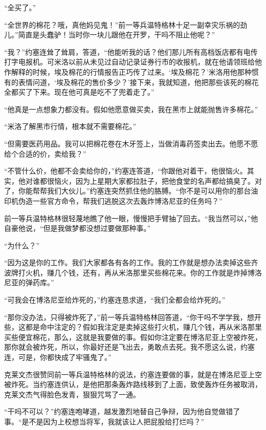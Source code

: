     “全买了。”

    “全世界的棉花？哦，真他妈见鬼！”前一等兵温特格林十足一副幸灾乐祸的劲儿。”简直是头蠢驴！当时你一块儿跟他在开罗，干吗不阻止他呢？”

    “我？”约塞连耸了耸肩，答道，“他能听我的话？他们那儿所有高档饭店都有电传打字电报机。可米洛以前从未见过自动记录证券行市的收报机，就在他请领班给他作解释的时候，埃及棉花的行情报告正巧传了过来。‘埃及棉花？’米洛用他那种惯有的表情问道，‘埃及棉花的售价多少？’接下来，我就知道，他把那些该死的棉花全都买了下来。现在他可真是吃不了兜着走了。”

    “他真是一点想象力都没有。假如他愿意做买卖，我在黑市上就能抛售许多棉花。”

    “米洛了解黑市行情，根本就不需要棉花。”

    “但需要医药用品。我可以把棉花卷在木牙签上，当做消毒药签卖出去。他愿不愿给个合适的价，卖给我？”

    “不管什么价，他都不会卖给你的，”约塞连答道，“你跟他对着干，他很恼火。其实，他对谁都很恼火，因为上星期大家都拉肚子，把他食堂的名声都给搞臭了。对了，你能帮帮我们大伙儿。”约塞连突然抓住他的胳膊。“你不是可以用你的那台油印机伪造一些官方命令，帮我们逃脱这次去轰炸博洛尼亚的任务吗？”

    前一等兵温特格林很轻蔑地瞧了他一眼，慢慢把手臂抽了回去。“我当然可以，”他自豪他说，“但是我做梦都没想过要做那种事。”

    “为什么？”

    “因为这是你的工作。我们大家都各有各的工作。我的工作就是想办法卖掉这些齐波牌打火机，赚几个钱，还有，再从米洛那里买些棉花来。你的工作就是炸掉博洛尼亚的弹药库。”

    “可我会在博洛尼亚给炸死的，”约塞连恳求道，“我们全都会给炸死的。”

    “那你没办法，只得被炸死了，”前一等兵温特格林回答道，“你干吗不学学我，想开些，这都是命中注定的？假如我注定是卖掉这些打火机，赚几个钱，再从米洛那里买些便宜棉花，那么，这就是我要做的事。假如你注定要在博洛尼亚上空被炸死，那你就会被炸死，所以，你最好还是飞出去，勇敢点去死。我不愿这么说，约塞连，可是，你都快成了牢骚鬼了。”

    克莱文杰很赞同前一等兵温特格林的说法，约塞连要做的事，就是在博洛尼亚上空被炸死。当约塞连供认，是他把那条轰炸路线移到了上面，致使轰炸任务被取消，克莱文杰气得脸色发青，狠狠咒骂了一通。
 


    “干吗不可以？”约塞连咆哮道，越发激烈地替自己争辩，因为他自觉做错了事。“是不是因为上校想当将军，我就该让人把屁股给打烂吗？”

